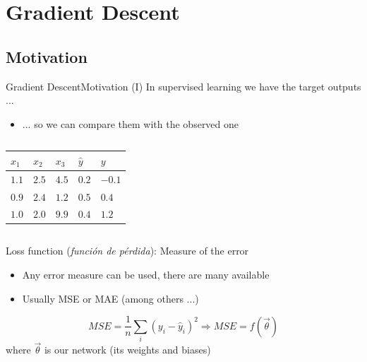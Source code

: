 \documentclass[10pt,compress]{beamer} %
\begin{document}
\section{Gradient Descent}
\subsection{Motivation}

\begin{frame}{Gradient Descent}{Motivation (I)}
    In supervised learning we have the target outputs ...
	\begin{itemize}
	\item ... so we can compare them with the observed one
	\end{itemize}

	\begin{columns}[c]
            

            \begin{table}[]
            \centering
            \begin{tabular}{lll|l|l}\hline
		    $x_1$ & $x_2$ & $x_3$ & $\hat{y}$ & $y$ \\
               \hline
              $1.1$ & $2.5$ & $4.5$ & $0.2$ & $-0.1$   \\
              $0.9$ & $2.4$ & $1.2$ & $0.5$ & $0.4$  \\
              $1.0$ & $2.0$ & $9.9$ & $0.4$ & $1.2$ \\\hline
            \end{tabular}
	    \end{table}
    \end{columns}

	\alert{Loss function} (\textit{función de pérdida}): Measure of the error
        \begin{itemize}
		\item Any error measure can be used, there are many available
		\item Usually MSE or MAE (among others ...)
        \end{itemize}

	\begin{equation*}
		MSE = \frac{1}{n} \sum_i(y_i-\hat{y}_i)^2 \Rightarrow MSE = f(\vec{\theta})
	\end{equation*}
	where $\vec{\theta}$ is our network (its weights and biases)
\end{frame}
\end{document}
